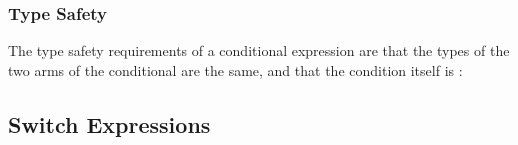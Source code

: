 \subsubsection{Type Safety}
The type safety requirements of a conditional expression are that the types of the two arms of the conditional are the same, and that the condition itself is \safeinf{}:

\begin{prooftree}
\end{prooftree}


\subsection{Switch Expressions}
\label{caseExpression}

